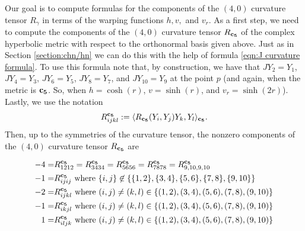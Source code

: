 \documentclass[10pt]{amsart}
\def\nin{\not \in}
\def\g{\gamma}
\def\la{\langle}
\def\ra{\rangle}
\theoremstyle{definition}
\theoremstyle{remark}
\numberwithin{equation}{section}
\begin{document}
Our goal is to compute formulas for the components of the $(4,0)$ curvature tensor $R_\g$ in terms of the warping functions $h, v,$ and $v_r$.  
As a first step, we need to compute the components of the $(4,0)$ curvature tensor $R_{\bf c_5}$ of the complex hyperbolic metric with respect to the orthonormal basis given above.  
Just as in Section \ref{section:chn/hn} we can do this with the help of formula \eqref{eqn:J curvature formula}.
To use this formula note that, by construction, we have that $JY_2 = Y_1$, $JY_4 = Y_3$, $JY_6 = Y_5$, $JY_8 = Y_7$, and $J Y_{10} = Y_9$ at the point $p$ (and again, when the metric is ${\bf c_5}$.  So, when $h = \cosh(r)$, $v = \sinh(r)$, and $v_r = \sinh(2r)$).
Lastly, we use the notation
	\begin{equation*}
	R^{\bf c_5}_{ijkl} := \la R_{\bf c_5}(Y_i,Y_j)Y_k, Y_l \ra_{\bf c_5}.
	\end{equation*}
Then, up to the symmetries of the curvature tensor, the nonzero components of the $(4,0)$ curvature tensor $R_{\bf c_5}$ are

	\begin{align} 
	-4 = &R^{\bf c_5}_{1212} = R^{\bf c_5}_{3434} = R^{\bf c_5}_{5656} = R^{\bf c_5}_{7878} = R^{\bf c_5}_{9,10,9,10}  \label{eqn:c4 tensor 1}  \\
	-1 = &R^{\bf c_5}_{ijij} \text{ where } \{ i,j \} \nin \{ \{1,2 \}, \{ 3, 4 \}, \{ 5, 6 \}, \{ 7, 8 \}, \{ 9, 10 \} \}  \label{eqn:c4 tensor 2}  \\
	-2 = &R^{\bf c_5}_{ijkl} \text{ where }  (i,j) \neq (k, l) \in \{ (1,2), ( 3,4), (5,6), (7,8), (9,10) \}  \label{eqn:c4 tensor 3}  \\  %
	-1 = &R^{\bf c_5}_{ikjl} \text{ where }  (i,j) \neq (k, l) \in \{ (1,2), ( 3, 4), ( 5, 6), ( 7, 8), ( 9, 10) \}    \label{eqn:c4 tensor 4}  \\
	1 = &R^{\bf c_5}_{iljk} \text{ where }  (i,j) \neq (k, l) \in \{ (1,2), ( 3, 4), ( 5, 6), ( 7, 8), ( 9, 10) \}  \label{eqn:c4 tensor 5}
	\end{align}
	
\end{document}
